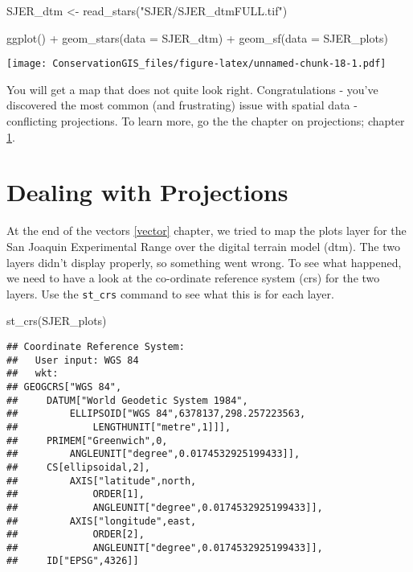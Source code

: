 \documentclass[
]{book}
\newenvironment{Shaded}{\begin{snugshade}}{\end{snugshade}}
\newcommand{\AttributeTok}[1]{\textcolor[rgb]{0.77,0.63,0.00}{#1}}
\newcommand{\FunctionTok}[1]{\textcolor[rgb]{0.00,0.00,0.00}{#1}}
\newcommand{\NormalTok}[1]{#1}
\newcommand{\OtherTok}[1]{\textcolor[rgb]{0.56,0.35,0.01}{#1}}
\newcommand{\SpecialCharTok}[1]{\textcolor[rgb]{0.00,0.00,0.00}{#1}}
\newcommand{\StringTok}[1]{\textcolor[rgb]{0.31,0.60,0.02}{#1}}
\begin{document}
\begin{Shaded}
\begin{Highlighting}[]
\NormalTok{SJER\_dtm }\OtherTok{\textless{}{-}} \FunctionTok{read\_stars}\NormalTok{(}\StringTok{"SJER/SJER\_dtmFULL.tif"}\NormalTok{)}

\FunctionTok{ggplot}\NormalTok{() }\SpecialCharTok{+}
  \FunctionTok{geom\_stars}\NormalTok{(}\AttributeTok{data =}\NormalTok{ SJER\_dtm) }\SpecialCharTok{+}
  \FunctionTok{geom\_sf}\NormalTok{(}\AttributeTok{data =}\NormalTok{ SJER\_plots)}
\end{Highlighting}
\end{Shaded}

\texttt{[image: ConservationGIS\_files/figure-latex/unnamed-chunk-18-1.pdf]}

You will get a map that does not quite look right. Congratulations - you've discovered the most common (and frustrating) issue with spatial data - conflicting projections. To learn more, go the the chapter on projections; chapter \ref{projections}.

\hypertarget{projections}{%
\chapter{Dealing with Projections}\label{projections}}

At the end of the vectors \ref{vector} chapter, we tried to map the plots layer for the San Joaquin Experimental Range over the digital terrain model (dtm). The two layers didn't display properly, so something went wrong. To see what happened, we need to have a look at the co-ordinate reference system (crs) for the two layers. Use the \texttt{st\_crs} command to see what this is for each layer.

\begin{Shaded}
\begin{Highlighting}[]
\FunctionTok{st\_crs}\NormalTok{(SJER\_plots)}
\end{Highlighting}
\end{Shaded}

\begin{verbatim}
## Coordinate Reference System:
##   User input: WGS 84 
##   wkt:
## GEOGCRS["WGS 84",
##     DATUM["World Geodetic System 1984",
##         ELLIPSOID["WGS 84",6378137,298.257223563,
##             LENGTHUNIT["metre",1]]],
##     PRIMEM["Greenwich",0,
##         ANGLEUNIT["degree",0.0174532925199433]],
##     CS[ellipsoidal,2],
##         AXIS["latitude",north,
##             ORDER[1],
##             ANGLEUNIT["degree",0.0174532925199433]],
##         AXIS["longitude",east,
##             ORDER[2],
##             ANGLEUNIT["degree",0.0174532925199433]],
##     ID["EPSG",4326]]
\end{verbatim}
\end{document}
